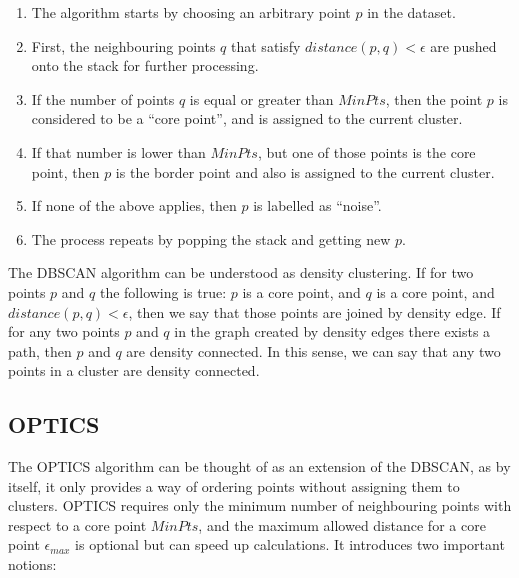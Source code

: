 \begin{center}
\begin{enumerate}
\item The algorithm starts by choosing an arbitrary point $p$ in the dataset.
\item First, the neighbouring points $q$ that satisfy $ distance(p,q) < \epsilon$ are pushed onto the stack for further processing.
\item If the number of points $q$ is equal or greater than $MinPts$, then the point $p$ is considered to be a ``core point'', and is assigned to the current cluster.
\item If that number is lower than $MinPts$, but one of those points is the core point, then $p$ is the border point and also is assigned to the current cluster.
\item If none of the above applies, then $p$ is labelled as ``noise''.
\item The process repeats by popping the stack and getting new $p$.
\end{enumerate}
\end{center}

The DBSCAN algorithm can be understood as density clustering.
If for two points $p$ and $q$ the following is true: $p$ is a core point, and $q$ is a core point, and  $distance(p,q) < \epsilon$, then we say that those points are joined by density edge.
If for any two points $p$ and $q$ in the graph created by density edges there exists a path, then $p$ and $q$ are density connected.
In this sense, we can say that any two points in a cluster are density connected.

\subsection{OPTICS}

The OPTICS \cite{10.1145/304182.304187, rhys2020machine} algorithm can be thought of as an extension of the DBSCAN, as by itself, it only provides a way of ordering points without assigning them to clusters.
OPTICS requires only the minimum number of neighbouring points with respect to a core point $MinPts$, and the maximum allowed distance for a core point $\epsilon_{max}$ is optional but can speed up calculations.
It introduces two important notions:

